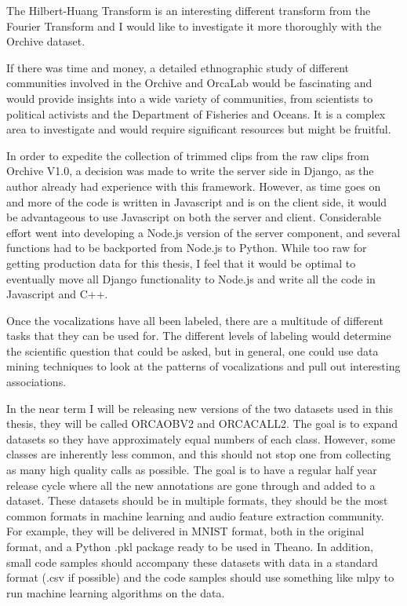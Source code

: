 The Hilbert-Huang Transform \cite{adam2006hilbert} is an interesting
different transform from the Fourier Transform and I would like to
investigate it more thoroughly with the Orchive dataset.

If there was time and money, a detailed ethnographic study of
different communities involved in the Orchive and OrcaLab would be
fascinating and would provide insights into a wide variety of
communities, from scientists to political activists and the Department
of Fisheries and Oceans.  It is a complex area to investigate and
would require significant resources but might be fruitful.

In order to expedite the collection of trimmed clips from the raw
clips from Orchive V1.0, a decision was made to write the server side
in Django, as the author already had experience with this framework.
However, as time goes on and more of the code is written in Javascript
and is on the client side, it would be advantageous to use Javascript
on both the server and client.  Considerable effort went into
developing a Node.js version of the server component, and several
functions had to be backported from Node.js to Python.  While too raw
for getting production data for this thesis, I feel that it would be
optimal to eventually move all Django functionality to Node.js and
write all the code in Javascript and C++.

Once the vocalizations have all been labeled, there are a multitude of
different tasks that they can be used for.  The different levels of
labeling would determine the scientific question that could be asked,
but in general, one could use data mining techniques to look at the
patterns of vocalizations and pull out interesting associations.

In the near term I will be releasing new versions of the two datasets
used in this thesis, they will be called ORCAOBV2 and ORCACALL2.  The
goal is to expand datasets so they have approximately equal numbers of
each class.  However, some classes are inherently less common, and
this should not stop one from collecting as many high quality calls as
possible.  The goal is to have a regular half year release cycle where
all the new annotations are gone through and added to a dataset.
These datasets should be in multiple formats, they should be the most
common formats in machine learning and audio feature extraction
community.  For example, they will be delivered in MNIST format, both
in the original format, and a Python .pkl package ready to be used in
Theano.  In addition, small code samples should accompany these
datasets with data in a standard format (.csv if possible) and the
code samples should use something like mlpy to run machine learning
algorithms on the data.

